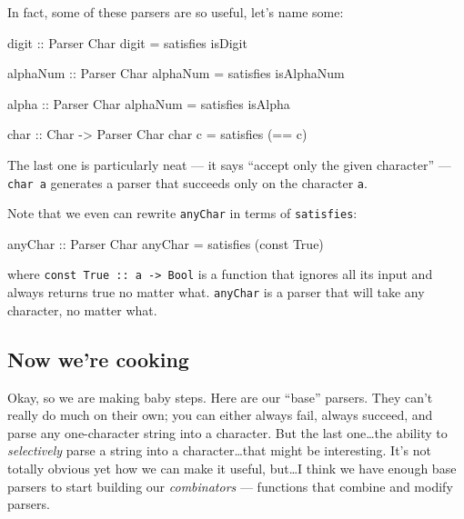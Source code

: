 \documentclass[]{article}
\newenvironment{Shaded}{}{}
\newcommand{\DataTypeTok}[1]{\textcolor[rgb]{0.56,0.13,0.00}{{#1}}}
\newcommand{\OtherTok}[1]{\textcolor[rgb]{0.00,0.44,0.13}{{#1}}}
\newcommand{\FunctionTok}[1]{\textcolor[rgb]{0.02,0.16,0.49}{{#1}}}
\newcommand{\NormalTok}[1]{{#1}}
\begin{document}
In fact, some of these parsers are so useful, let's name some:

\begin{Shaded}
\begin{Highlighting}[]
\OtherTok{digit ::} \DataTypeTok{Parser} \DataTypeTok{Char}
\NormalTok{digit }\FunctionTok{=} \NormalTok{satisfies isDigit}

\OtherTok{alphaNum ::} \DataTypeTok{Parser} \DataTypeTok{Char}
\NormalTok{alphaNum }\FunctionTok{=} \NormalTok{satisfies isAlphaNum}

\OtherTok{alpha ::} \DataTypeTok{Parser} \DataTypeTok{Char}
\NormalTok{alphaNum }\FunctionTok{=} \NormalTok{satisfies isAlpha}

\OtherTok{char ::} \DataTypeTok{Char} \OtherTok{->} \DataTypeTok{Parser} \DataTypeTok{Char}
\NormalTok{char c }\FunctionTok{=} \NormalTok{satisfies (}\FunctionTok{==} \NormalTok{c)}
\end{Highlighting}
\end{Shaded}

The last one is particularly neat --- it says ``accept only the given
character'' --- \texttt{char\ \textquotesingle{}a\textquotesingle{}}
generates a parser that succeeds only on the character \texttt{a}.

Note that we even can rewrite \texttt{anyChar} in terms of
\texttt{satisfies}:

\begin{Shaded}
\begin{Highlighting}[]
\OtherTok{anyChar ::} \DataTypeTok{Parser} \DataTypeTok{Char}
\NormalTok{anyChar }\FunctionTok{=} \NormalTok{satisfies (const }\DataTypeTok{True}\NormalTok{)}
\end{Highlighting}
\end{Shaded}

where \texttt{const\ True\ ::\ a\ -\textgreater{}\ Bool} is a function
that ignores all its input and always returns true no matter what.
\texttt{anyChar} is a parser that will take any character, no matter
what.

\subsection{Now we're cooking}\label{now-were-cooking}

Okay, so we are making baby steps. Here are our ``base'' parsers. They
can't really do much on their own; you can either always fail, always
succeed, and parse any one-character string into a character. But the
last one\ldots{}the ability to \emph{selectively} parse a string into a
character\ldots{}that might be interesting. It's not totally obvious yet
how we can make it useful, but\ldots{}I think we have enough base
parsers to start building our \emph{combinators} --- functions that
combine and modify parsers.
\end{document}
